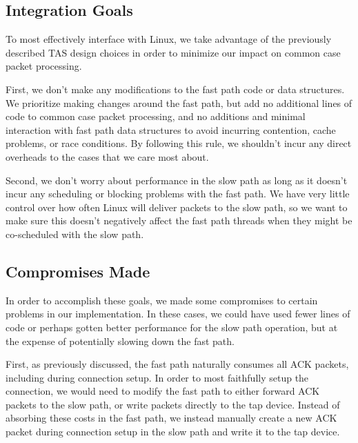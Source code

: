 \subsection{Integration Goals}

To most effectively interface with Linux, we take advantage of the previously 
described TAS design choices in order to minimize our impact on common case
packet processing. 

First, we don't make any modifications to the fast path code or data structures.
We prioritize making changes around the fast path, but add no additional lines 
of code to common case packet processing, and no additions and minimal 
interaction with fast path data structures to avoid incurring contention, cache 
problems, or race conditions. By following this rule, we shouldn't incur any
direct overheads to the cases that we care most about.

Second, we don't worry about performance in the slow path as long as it
doesn't incur any scheduling or blocking problems with the fast path. We have 
very little control over how often Linux will deliver packets to the slow path, 
so we want to make sure this doesn't negatively affect the fast path threads 
when they might be co-scheduled with the slow path.

\subsection{Compromises Made}

In order to accomplish these goals, we made some compromises to certain problems
in our implementation. In these cases, we could have used fewer lines of code or 
perhaps gotten better performance for the slow path operation, but at the 
expense of potentially slowing down the fast path.

First, as previously discussed, the fast path naturally consumes all ACK packets,
including during connection setup. In order to most faithfully setup the 
connection, we would need to modify the fast path to either forward ACK packets 
to the slow path, or write packets directly to the tap device. Instead of 
absorbing these costs in the fast path, we instead manually create a new ACK
packet during connection setup in the slow path and write it to the tap device.

